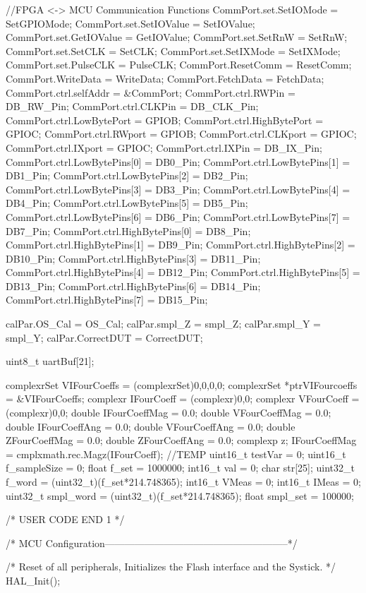 {	//FPGA <-> MCU Communication Functions
	CommPort.set.SetIOMode = SetGPIOMode;
	CommPort.set.SetIOValue = SetIOValue;
	CommPort.set.GetIOValue = GetIOValue;
	CommPort.set.SetRnW = SetRnW;
	CommPort.set.SetCLK = SetCLK;
	CommPort.set.SetIXMode = SetIXMode;
	CommPort.set.PulseCLK = PulseCLK;
	CommPort.ResetComm = ResetComm;
	CommPort.WriteData = WriteData;
	CommPort.FetchData = FetchData;
	CommPort.ctrl.selfAddr = &CommPort;
	CommPort.ctrl.RWPin = DB_RW_Pin;
	CommPort.ctrl.CLKPin = DB_CLK_Pin;
	CommPort.ctrl.LowBytePort = GPIOB;
	CommPort.ctrl.HighBytePort = GPIOC;
	CommPort.ctrl.RWport = GPIOB;
	CommPort.ctrl.CLKport = GPIOC;
	CommPort.ctrl.IXport = GPIOC;
	CommPort.ctrl.IXPin = DB_IX_Pin;
	CommPort.ctrl.LowBytePins[0] = DB0_Pin;
	CommPort.ctrl.LowBytePins[1] = DB1_Pin;
	CommPort.ctrl.LowBytePins[2] = DB2_Pin;
	CommPort.ctrl.LowBytePins[3] = DB3_Pin;
	CommPort.ctrl.LowBytePins[4] = DB4_Pin;
	CommPort.ctrl.LowBytePins[5] = DB5_Pin;
	CommPort.ctrl.LowBytePins[6] = DB6_Pin;
	CommPort.ctrl.LowBytePins[7] = DB7_Pin;
	CommPort.ctrl.HighBytePins[0] = DB8_Pin;
	CommPort.ctrl.HighBytePins[1] = DB9_Pin;
	CommPort.ctrl.HighBytePins[2] = DB10_Pin;
	CommPort.ctrl.HighBytePins[3] = DB11_Pin;
	CommPort.ctrl.HighBytePins[4] = DB12_Pin;
	CommPort.ctrl.HighBytePins[5] = DB13_Pin;
	CommPort.ctrl.HighBytePins[6] = DB14_Pin;
	CommPort.ctrl.HighBytePins[7] = DB15_Pin;

	calPar.OS_Cal = OS_Cal;
	calPar.smpl_Z = smpl_Z;
	calPar.smpl_Y = smpl_Y;
	calPar.CorrectDUT = CorrectDUT;

	uint8_t uartBuf[21];

	complexrSet VIFourCoeffs = (complexrSet){{0,0},{0,0}};
	complexrSet *ptrVIFourcoeffs = &VIFourCoeffs;
	complexr IFourCoeff = (complexr){0,0};
	complexr VFourCoeff = (complexr){0,0};
	double IFourCoeffMag = 0.0;
	double VFourCoeffMag = 0.0;
	double IFourCoeffAng = 0.0;
	double VFourCoeffAng = 0.0;
	double ZFourCoeffMag = 0.0;
	double ZFourCoeffAng = 0.0;
	complexp z;
	IFourCoeffMag = cmplxmath.rec.Magz(IFourCoeff);
	//TEMP
	uint16_t testVar = 0;
	uint16_t f_sampleSize = 0;
	float f_set = 1000000;
	int16_t val = 0;
	char str[25];
	uint32_t f_word = (uint32_t)(f_set*214.748365);
	int16_t VMeas = 0;
	int16_t IMeas = 0;
	uint32_t smpl_word = (uint32_t)(f_set*214.748365);
	float smpl_set = 100000;



  /* USER CODE END 1 */

  /* MCU Configuration--------------------------------------------------------*/

  /* Reset of all peripherals, Initializes the Flash interface and the Systick. */
  HAL_Init();

}
